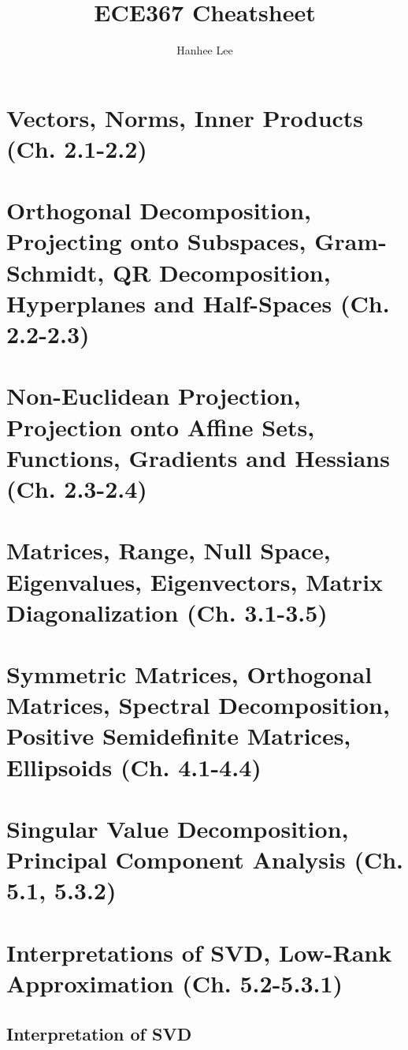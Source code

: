 \documentclass{article}
\title{ECE367 Cheatsheet}
\author{Hanhee Lee}
\begin{document}
\maketitle

\tableofcontents

\listoffigures

\listoftables

\section{Vectors, Norms, Inner Products (Ch. 2.1-2.2)}

\section{Orthogonal Decomposition, Projecting onto Subspaces, Gram-Schmidt, QR Decomposition, Hyperplanes and Half-Spaces (Ch. 2.2-2.3)}

\section{Non-Euclidean Projection, Projection onto Affine Sets, Functions, Gradients and Hessians (Ch. 2.3-2.4)}

\section{Matrices, Range, Null Space, Eigenvalues, Eigenvectors, Matrix Diagonalization (Ch. 3.1-3.5)}

\section{Symmetric Matrices, Orthogonal Matrices, Spectral Decomposition, Positive Semidefinite Matrices, Ellipsoids (Ch. 4.1-4.4)}

\section{Singular Value Decomposition, Principal Component Analysis (Ch. 5.1, 5.3.2)}

\section{Interpretations of SVD, Low-Rank Approximation (Ch. 5.2-5.3.1)}
    \subsection{Interpretation of SVD}
\end{document}
